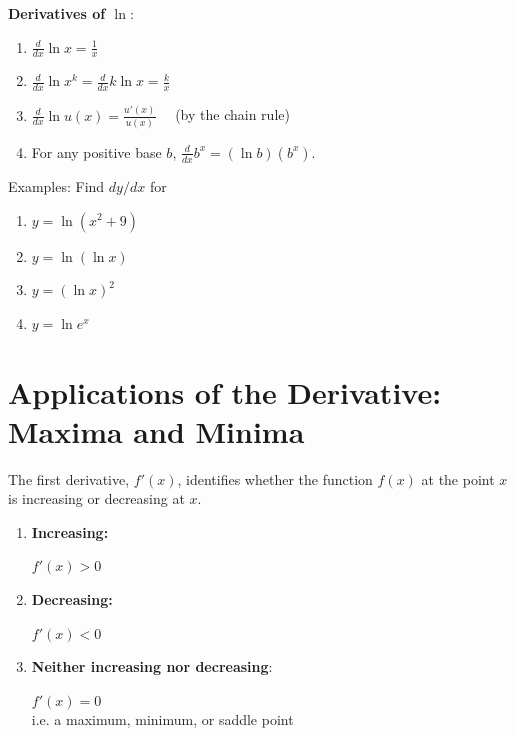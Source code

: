 \documentclass[]{book}
\theoremstyle{definition}
\theoremstyle{definition}
\theoremstyle{definition}
\theoremstyle{remark}
\begin{document}
\textbf{Derivatives of $\ln$}:

\begin{enumerate}
        \item $\frac{d}{dx} \ln x = \frac{1}{x}$
        \item $\frac{d}{dx} \ln x^k = \frac{d}{dx} k \ln x = \frac{k}{x}$
        \item $\frac{d}{dx} \ln u(x) = \frac{u'(x)}{u(x)}\quad$  (by the chain rule)
        \item For any positive base $b$, $\frac{d}{dx} b^x = (\ln b)\left(b^x\right)$.
\end{enumerate}

Examples: Find \(dy/dx\) for

\begin{enumerate}
        \item \parbox[t]{1.5in}{$y=\ln(x^2+9)$}\parbox[t]{4in}{\phantom{Let $u(x)=x^2+9$.  Then $u'(x)=2x$ and $dy/dx=u'(x)/u(x)=2x/(x^2+9)$.}} 
        \item \parbox[t]{1.5in}{$y=\ln(\ln x)$}\parbox[t]{4in}{\phantom{Let $u(x)=\ln x$.  Then $u'(x)=1/x$ and $dy/dx=1/(x\ln x)$.}} 
        \item \parbox[t]{1.5in}{$y=(\ln x)^2$}\parbox[t]{4in}{\phantom{Use the generalized power rule. $dy/dx=(2\ln x)/x$.}} 
        \item \parbox[t]{1.5in}{$y=\ln e^x$}\parbox[t]{4in}{\phantom{(We know that $\ln e^x=x$ and that $dx/dx=1$, but let's double check.)  Let $u(x)=e^x$.  Then $u'(x)=e^x$ and $dy/dx=u'(x)/u(x)=e^x/e^x=1$.}} 
\end{enumerate}

\section{Applications of the Derivative: Maxima and
Minima}\label{applications-of-the-derivative-maxima-and-minima}

The first derivative, \(f'(x)\), identifies whether the function
\(f(x)\) at the point \(x\) is increasing or decreasing at \(x\).

\begin{enumerate}
        \item \parbox[t]{4in}{\bf Increasing:} $f'(x)>0$
        \item \parbox[t]{4in}{\bf Decreasing:} $f'(x)<0$
        \item \parbox[t]{4in}{{\bf Neither increasing nor decreasing}:} $f'(x)=0$\\
             i.e. a maximum, minimum, or saddle point
\end{enumerate}
\end{document}
